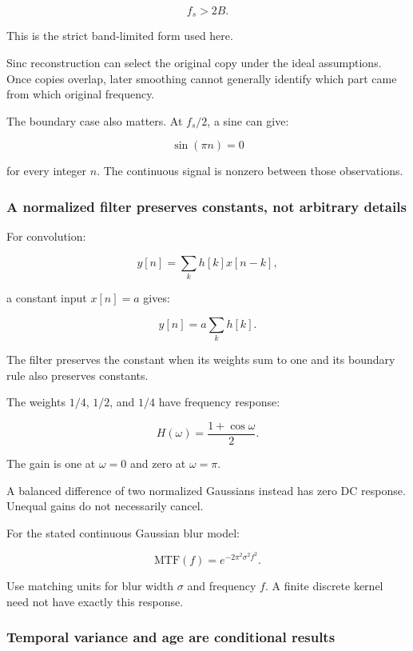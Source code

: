 \[
f_s>2B.
\]

This is the strict band-limited form used here.

Sinc reconstruction can select the original copy under the ideal assumptions. Once copies overlap, later smoothing cannot generally identify which part came from which original frequency.

The boundary case also matters. At \(f_s/2\), a sine can give:

\[
\sin(\pi n)=0
\]

for every integer \(n\). The continuous signal is nonzero between those observations.

\subsubsection{A normalized filter preserves constants, not arbitrary details}\label{04-visual-computing-ii-ch043-a-normalized-filter-preserves-constants-not-arbitrary-details}

\hypertarget{04-visual-computing-ii-ch043-a-normalized-filter-preserves-constants-not-arbitrary-details}{}

For convolution:

\[
y[n]=\sum_k h[k]x[n-k],
\]

a constant input \(x[n]=a\) gives:

\[
y[n]=a\sum_k h[k].
\]

The filter preserves the constant when its weights sum to one and its boundary rule also preserves constants.

The weights \(1/4\), \(1/2\), and \(1/4\) have frequency response:

\[
H(\omega)=\frac{1+\cos\omega}{2}.
\]

The gain is one at \(\omega=0\) and zero at \(\omega=\pi\).

A balanced difference of two normalized Gaussians instead has zero DC response. Unequal gains do not necessarily cancel.

For the stated continuous Gaussian blur model:

\[
\mathrm{MTF}(f)=e^{-2\pi^2\sigma^2f^2}.
\]

Use matching units for blur width \(\sigma\) and frequency \(f\). A finite discrete kernel need not have exactly this response.

\subsubsection{Temporal variance and age are conditional results}\label{04-visual-computing-ii-ch043-temporal-variance-and-age-are-conditional-results}

